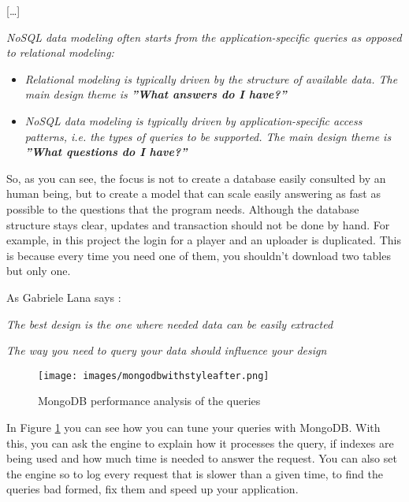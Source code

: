 \begin{center}
[\dots\unkern]
\end{center}

\textit{NoSQL data modeling often starts from the application-specific queries as opposed to relational modeling:}
\begin{itemize}
\item \textit{Relational modeling is typically driven by the structure of available data. The main design theme is  \textbf{”What answers do I have?”}}
\item \textit{NoSQL data modeling is typically driven by application-specific access patterns, i.e. the types of queries to be supported. The main design theme is \textbf{”What questions do I have?”}}
\end{itemize}

So, as you can see, the focus is not to create a database easily consulted by an human being, but to create a model that can scale easily answering as fast as possible to the questions that the program needs. Although the database structure stays clear, updates and transaction should not be done by hand. For example, in this project the login for a player and an uploader is duplicated. This is because every time you need one of them, you shouldn't download two tables but only one.

As Gabriele Lana says \cite{website:mongodbwithstyle}:

\begin{center}
	\textit{The best design is the one where needed data can be easily extracted}
\end{center}

\begin{center}
	\textit{The way you need to query your data should influence your design}
\end{center}

\begin{figure}[H]
\centering %
\texttt{[image: images/mongodbwithstyleafter.png]}
\caption{MongoDB performance analysis of the queries}
\label{fig:mongodbwithstyle}
\end{figure}

In Figure \ref{fig:mongodbwithstyle} you can see how you can tune your queries with MongoDB. With this, you can ask the engine to explain how it processes the query, if indexes are being used and how much time is needed to answer the request. You can also set the engine so to log every request that is slower than a given time, to find the queries bad formed, fix them and speed up your application.

